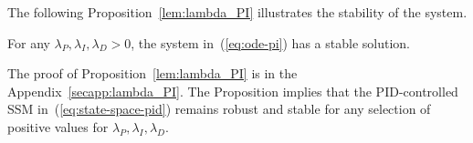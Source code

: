The following Proposition~\ref{lem:lambda_PI} illustrates the stability of the system.
\begin{proposition}
    \label{lem:lambda_PI} For any $\lambda_P, 
    \lambda_I, \lambda_D > 0$, the system in~(\ref{eq:ode-pi}) has a stable solution.
\end{proposition}
The proof of Proposition~\ref{lem:lambda_PI} is in the Appendix~\ref{secapp:lambda_PI}. 
The Proposition implies that the PID-controlled SSM in~(\ref{eq:state-space-pid}) remains robust and stable for any selection of positive values for $\lambda_P, \lambda_I, \lambda_D$.

